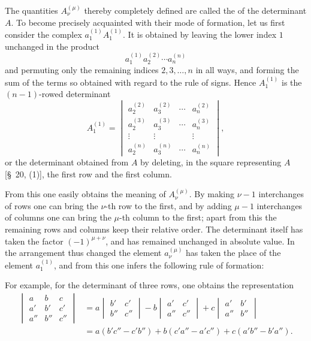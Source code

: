 
The quantities \(A_\nu^{(\mu)}\) thereby completely defined are called the  of the determinant \(A\). To become precisely acquainted with their mode of formation, let us first consider the complex \(a_1^{(1)}A_1^{(1)}\). It is obtained by leaving the lower index \(1\) unchanged in the product
\[
 a_1^{(1)}a_2^{(2)}\cdots a_n^{(n)}
\]
and permuting only the remaining indices \(2,3,\ldots,n\) in all ways, and forming the sum of the terms so obtained with regard to the rule of signs. Hence \(A_1^{(1)}\) is the \((n-1)\)-rowed determinant
\begin{equation}
 A_1^{(1)}=
\begin{vmatrix}
a_2^{(2)}&a_3^{(2)}&\cdots&a_n^{(2)}\\
a_2^{(3)}&a_3^{(3)}&\cdots&a_n^{(3)}\\
\vdots&\vdots&&\vdots\\
a_2^{(n)}&a_3^{(n)}&\cdots&a_n^{(n)}
\end{vmatrix},
\tag{4}
\end{equation}
or the determinant obtained from \(A\) by deleting, in the square representing \(A\) [\S~20, (1)], the first row and the first column.

From this one easily obtains the meaning of \(A_\nu^{(\mu)}\). By making \(\nu-1\) interchanges of rows one can bring the \(\nu\)-th row to the first, and by adding \(\mu-1\) interchanges of columns one can bring the \(\mu\)-th column to the first; apart from this the remaining rows and columns keep their relative order. The determinant itself has taken the factor \((-1)^{\mu+\nu}\), and has remained unchanged in absolute value. In the arrangement thus changed the element \(a_\nu^{(\mu)}\) has taken the place of the element \(a_1^{(1)}\), and from this one infers the following rule of formation:


For example, for the determinant of three rows, one obtains the representation
\begin{equation}
\begin{aligned}
\begin{vmatrix}
a&b&c\\
a'&b'&c'\\
a''&b''&c''
\end{vmatrix}
&=a\begin{vmatrix}b'&c'\\b''&c''\end{vmatrix}
-b\begin{vmatrix}a'&c'\\a''&c''\end{vmatrix}
+c\begin{vmatrix}a'&b'\\a''&b''\end{vmatrix}\\
&=a(b'c''-c'b'')+b(c'a''-a'c'')+c(a'b''-b'a'').
\end{aligned}
\tag{5}
\end{equation}

